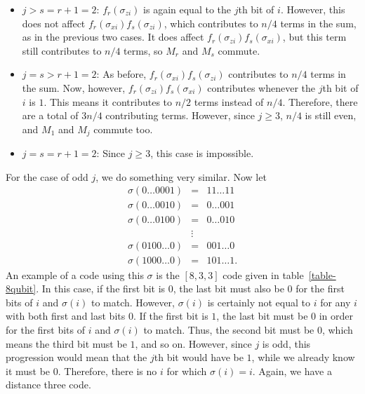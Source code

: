 \documentclass{report}
\newcommand{\Xs}[1]{\sigma_{x{#1}}}
\newcommand{\Zs}[1]{\sigma_{z{#1}}}
\begin{document}
\begin{itemize}
\item $j > s = r+1 = 2$: $f_r (\Zs{i})$ is again equal to the $j$th bit of 
$i$.  However, this does not affect $f_r (\Xs{i}) f_s (\Zs{i})$, which
contributes to $n/4$ terms in the sum, as in the previous two cases.  It does
affect $f_r (\Zs{i}) f_s (\Xs{i})$, but this term still contributes to $n/4$
terms, so $M_r$ and $M_s$ commute.

\item $j = s > r+1 = 2$: As before, $f_r (\Xs{i}) f_s (\Zs{i})$ contributes to 
$n/4$ terms in the sum.  Now, however, $f_r (\Zs{i}) f_s (\Xs{i})$ contributes 
whenever the $j$th bit of $i$ is $1$.  This means it contributes to $n/2$ 
terms instead of $n/4$.  Therefore, there are a total of $3n/4$ contributing 
terms.  However, since $j \geq 3$, $n/4$ is still even, and $M_1$ and 
$M_j$ commute too.

\item $j = s = r+1 = 2$: Since $j \geq 3$, this case is impossible.
\end{itemize}

For the case of odd $j$, we do something very similar.  Now let
\begin{eqnarray}
\sigma (0 \ldots 0 0 0 1) & = & 1 1 \ldots 1 1  \nonumber \\
\sigma (0 \ldots 0 0 1 0) & = & 0 \ldots 0 0 1 \nonumber \\
\sigma (0 \ldots 0 1 0 0) & = & 0 \ldots 0 1 0 \label{eq-sigma-odd}\\
& \vdots & \nonumber \\
\sigma (0 1 0 0 \ldots 0) & = & 0 0 1 \ldots 0 \nonumber \\
\sigma (1 0 0 0 \ldots 0) & = & 1 0 1 \ldots 1. \nonumber
\end{eqnarray}
An example of a code using this $\sigma$ is the $[8,3,3]$ code given in 
table~\ref{table-8qubit}.  In this case, if the first bit is 0, the last bit
must also be 0 for the first bits of $i$ and $\sigma(i)$ to match.  However,
$\sigma (i)$ is certainly not equal to $i$ for any $i$ with both first and last 
bits $0$.  If the first bit is $1$, the last bit must be $0$ in order for the 
first bits of $i$ and $\sigma (i)$ to match. Thus, the second bit must be $0$, 
which means the third bit must be $1$, and so on.  However, since $j$ is odd, 
this progression would mean that the $j$th bit would have be $1$, while we 
already know it must be $0$.  
Therefore, there is no $i$ for which $\sigma (i) = i$.  Again, we have a 
distance three code.
\end{document}

